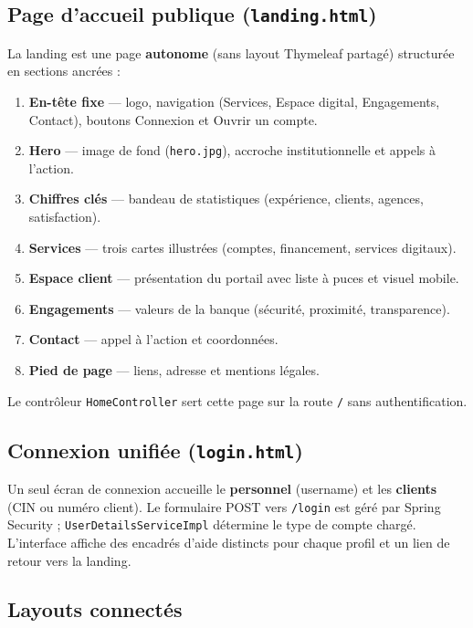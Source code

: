 \subsection{Page d'accueil publique (\texttt{landing.html})}

La landing est une page \textbf{autonome} (sans layout Thymeleaf partagé) structurée en sections ancrées :

\begin{enumerate}[leftmargin=*]
    \item \textbf{En-tête fixe} — logo, navigation (Services, Espace digital, Engagements, Contact), boutons Connexion et Ouvrir un compte.
    \item \textbf{Hero} — image de fond (\texttt{hero.jpg}), accroche institutionnelle et appels à l'action.
    \item \textbf{Chiffres clés} — bandeau de statistiques (expérience, clients, agences, satisfaction).
    \item \textbf{Services} — trois cartes illustrées (comptes, financement, services digitaux).
    \item \textbf{Espace client} — présentation du portail avec liste à puces et visuel mobile.
    \item \textbf{Engagements} — valeurs de la banque (sécurité, proximité, transparence).
    \item \textbf{Contact} — appel à l'action et coordonnées.
    \item \textbf{Pied de page} — liens, adresse et mentions légales.
\end{enumerate}

Le contrôleur \texttt{HomeController} sert cette page sur la route \texttt{/} sans authentification.

\subsection{Connexion unifiée (\texttt{login.html})}

Un seul écran de connexion accueille le \textbf{personnel} (username) et les \textbf{clients} (CIN ou numéro client). Le formulaire POST vers \texttt{/login} est géré par Spring Security ; \texttt{UserDetailsServiceImpl} détermine le type de compte chargé. L'interface affiche des encadrés d'aide distincts pour chaque profil et un lien de retour vers la landing.

\subsection{Layouts connectés}

